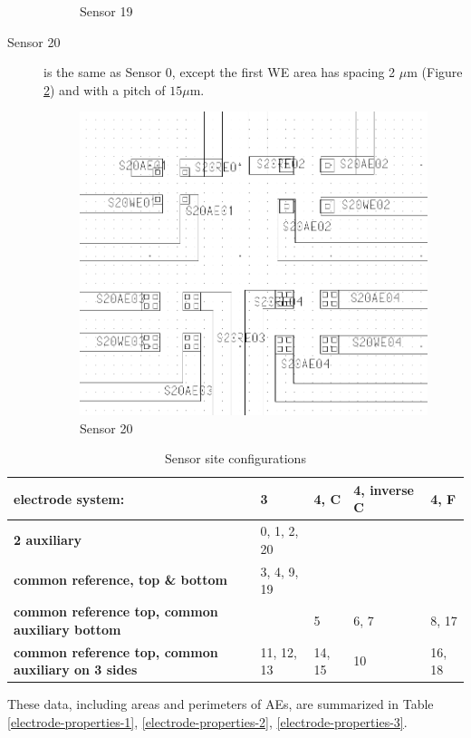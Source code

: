 \begin{description}
\begin{figure}
\begin{minipage}{0.5\linewidth}
		\caption{Sensor 19}
		\label{s19}
	\end{minipage}
\end{figure}

\item[Sensor 20] is the same as Sensor 0, except the first WE area has spacing 2 $\mu \mathrm{m}$ (Figure \ref{s20}) and with a pitch of $15 \mu \mathrm{m}$.

\begin{figure}
	\centering
	\includegraphics[width=0.3\linewidth]{figures/s20.png}
	\caption{Sensor 20}
	\label{s20}
\end{figure}

\end{description}

\begin{table}
	\begin{tabular}{p{4cm}|p{2cm}|p{2cm}|p{2.5cm}|p{2cm}}
		electrode system: & \textbf{3} & \textbf{4, C} & \textbf{4, inverse C} & \textbf{4, F} \\
		\hline
		\textbf{2 auxiliary} & 0, 1, 2, 20 & & & \\
		\hline
		\textbf{common reference, top \& bottom} & 3, 4, 9, 19 & & & \\
		\hline
		\textbf{common reference top, common auxiliary bottom} & & 5 & 6, 7 & 8, 17 \\
		\hline
		\textbf{common reference top, common auxiliary on 3 sides} & 11, 12, 13 & 14, 15 & 10 & 16, 18
	\end{tabular}
	\caption{Sensor site configurations}
	\label{sensor-config}
\end{table}

These data, including areas and perimeters of AEs, are summarized in Table \ref{electrode-properties-1}, \ref{electrode-properties-2}, \ref{electrode-properties-3}.

